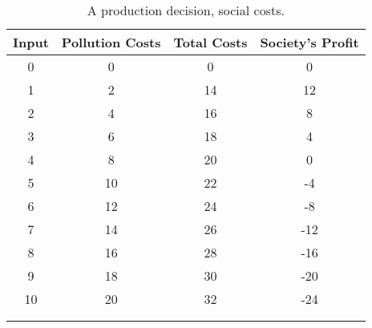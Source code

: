\begin{longtable}{cccc}
\hline
\textbf{Input} & \textbf{Pollution Costs} & \textbf{Total Costs} & \textbf{Society's Profit}\\ 
\hline
0 & 0 & 0 & 0 \\
1 & 2 & 14 & 12 \\
2 & 4 & 16 & 8 \\
3 & 6 & 18 & 4 \\
4 & 8 & 20 & 0 \\
5 & 10 & 22 & -4\\
6 & 12 & 24 & -8 \\
7 & 14 & 26 & -12 \\
8 & 16 & 28 & -16 \\
9 & 18 & 30 & -20 \\
10 & 20 & 32 & -24 \\
\hline \\

\caption{A production decision, social costs.}  \label{tab:production_decision_social}\\
\end{longtable}
